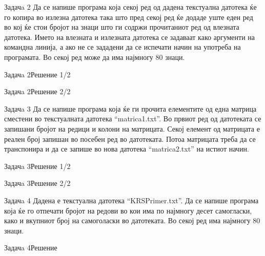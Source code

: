 \begin{frame}{Задачa 2}
Да се напише програма која секој ред од дадена текстуална датотека ќе го копира
во излезна датотека така што пред секој ред ќе додаде уште еден ред во кој ќе
стои бројот на знаци што ги содржи прочитаниот ред од влезната датотека. Името
на влезната и излезната датотека се задаваат како аргументи на командна линија,
а ако не се зададени да се испечати начин на употреба на програмата. Во секој
ред може да има најмногу 80 знаци.
\end{frame}

\begin{frame}[fragile]{Задачa 2}{Решение 1/2} 

\end{frame}



\begin{frame}[fragile]{Задачa 2}{Решение 2/2} 

\end{frame}

\begin{frame}{Задачa 3}
Да се напише програма која ќе ги прочита елементите од една матрица сместени во
текстуалната датотека ``matrica1.txt''. Во првиот ред од датотеката се запишани
бројот на редици и колони на матрицата. Секој елемент од матрицата е реален број
запишан во посебен ред во датотеката. Потоа матрицата треба да се транспонира и
да се запише во нова датотека ``matrica2.txt'' на истиот начин.
\end{frame}

\begin{frame}[fragile]{Задачa 3}{Решение 1/2} 

\end{frame}



\begin{frame}[fragile]{Задачa 3}{Решение 2/2} 

\end{frame}


\begin{frame}{Задачa 4}
Дадена е текстуална датотека ``KRSPrimer.txt''. Да се напише програма која ќе го
отпечати бројот на редови во кои има по најмногу десет самогласки, како и
вкупниот број на самоголаски во датотеката. Во секој ред има најмногу 80 знаци.
\end{frame}

\begin{frame}[fragile]{Задачa 4}{Решение}

\end{frame}

